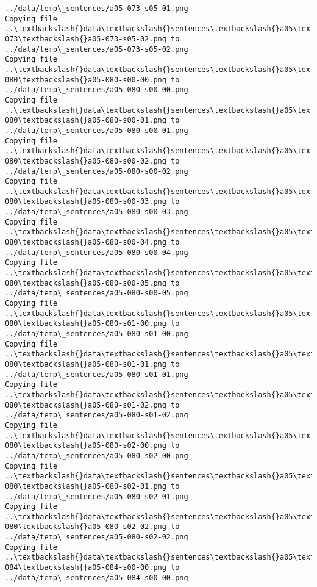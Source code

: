 \documentclass[11pt]{article}
\begin{document}
\begin{Verbatim}[commandchars=\\\{\}]
../data/temp\_sentences/a05-073-s05-01.png
Copying file ..\textbackslash{}data\textbackslash{}sentences\textbackslash{}a05\textbackslash{}a05-073\textbackslash{}a05-073-s05-02.png to
../data/temp\_sentences/a05-073-s05-02.png
Copying file ..\textbackslash{}data\textbackslash{}sentences\textbackslash{}a05\textbackslash{}a05-080\textbackslash{}a05-080-s00-00.png to
../data/temp\_sentences/a05-080-s00-00.png
Copying file ..\textbackslash{}data\textbackslash{}sentences\textbackslash{}a05\textbackslash{}a05-080\textbackslash{}a05-080-s00-01.png to
../data/temp\_sentences/a05-080-s00-01.png
Copying file ..\textbackslash{}data\textbackslash{}sentences\textbackslash{}a05\textbackslash{}a05-080\textbackslash{}a05-080-s00-02.png to
../data/temp\_sentences/a05-080-s00-02.png
Copying file ..\textbackslash{}data\textbackslash{}sentences\textbackslash{}a05\textbackslash{}a05-080\textbackslash{}a05-080-s00-03.png to
../data/temp\_sentences/a05-080-s00-03.png
Copying file ..\textbackslash{}data\textbackslash{}sentences\textbackslash{}a05\textbackslash{}a05-080\textbackslash{}a05-080-s00-04.png to
../data/temp\_sentences/a05-080-s00-04.png
Copying file ..\textbackslash{}data\textbackslash{}sentences\textbackslash{}a05\textbackslash{}a05-080\textbackslash{}a05-080-s00-05.png to
../data/temp\_sentences/a05-080-s00-05.png
Copying file ..\textbackslash{}data\textbackslash{}sentences\textbackslash{}a05\textbackslash{}a05-080\textbackslash{}a05-080-s01-00.png to
../data/temp\_sentences/a05-080-s01-00.png
Copying file ..\textbackslash{}data\textbackslash{}sentences\textbackslash{}a05\textbackslash{}a05-080\textbackslash{}a05-080-s01-01.png to
../data/temp\_sentences/a05-080-s01-01.png
Copying file ..\textbackslash{}data\textbackslash{}sentences\textbackslash{}a05\textbackslash{}a05-080\textbackslash{}a05-080-s01-02.png to
../data/temp\_sentences/a05-080-s01-02.png
Copying file ..\textbackslash{}data\textbackslash{}sentences\textbackslash{}a05\textbackslash{}a05-080\textbackslash{}a05-080-s02-00.png to
../data/temp\_sentences/a05-080-s02-00.png
Copying file ..\textbackslash{}data\textbackslash{}sentences\textbackslash{}a05\textbackslash{}a05-080\textbackslash{}a05-080-s02-01.png to
../data/temp\_sentences/a05-080-s02-01.png
Copying file ..\textbackslash{}data\textbackslash{}sentences\textbackslash{}a05\textbackslash{}a05-080\textbackslash{}a05-080-s02-02.png to
../data/temp\_sentences/a05-080-s02-02.png
Copying file ..\textbackslash{}data\textbackslash{}sentences\textbackslash{}a05\textbackslash{}a05-084\textbackslash{}a05-084-s00-00.png to
../data/temp\_sentences/a05-084-s00-00.png

\end{Verbatim}
\end{document}
